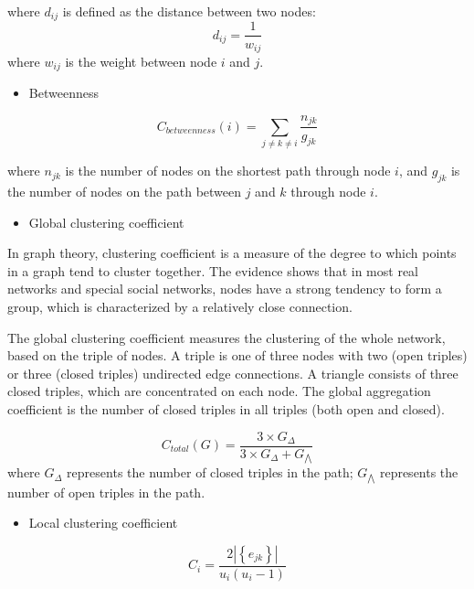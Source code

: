 \documentclass{mcmthesis}
\begin{document}
where $d_{ij}$ is defined as the distance between two nodes:
\begin{equation}
d_{ij}=\frac{1}{w_{ij}}
\end{equation}
where $w_{ij}$ is the weight between node $i$ and $j$.

\begin{itemize}
\item Betweenness
\end{itemize}
\begin{equation}
C_{betweenness}\left(i\right)=\sum_{j\neq k\neq i}\frac{n_{jk}}{g_{jk}}
\end{equation}

where $n_{jk}$ is the number of nodes on the shortest path through node $i$, and $g_{jk}$ is the number of nodes on the path between $j$ and $k$ through node $i$.
\begin{itemize}
\item Global clustering coefficient
\end{itemize}
In graph theory, clustering coefficient is a measure of the degree to which points in a graph tend to cluster together. The evidence shows that in most real networks and special social networks, nodes have a strong tendency to form a group, which is characterized by a relatively close connection.


The global clustering coefficient measures the clustering of the whole network, based on the triple of nodes. A triple is one of three nodes with two (open triples) or three (closed triples) undirected edge connections. A triangle consists of three closed triples, which are concentrated on each node. The global aggregation coefficient is the number of closed triples in all triples (both open and closed).

\begin{equation}
C_{total}\left(G\right)=\frac{3\times G_{\Delta}}{3\times G_{\Delta}+G_{\bigwedge}}
\end{equation}
where $G_{\Delta}$ represents the number of closed triples in the path; $G_{\bigwedge}$ represents the number of open triples in the path.

\begin{itemize}
\item Local clustering coefficient
\end{itemize}
\begin{equation}
C_{i}=\frac{2|\left\{e_{jk}\right\}|}{u_{i}\left(u_{i}-1\right)}
\end{equation}
\end{document}
